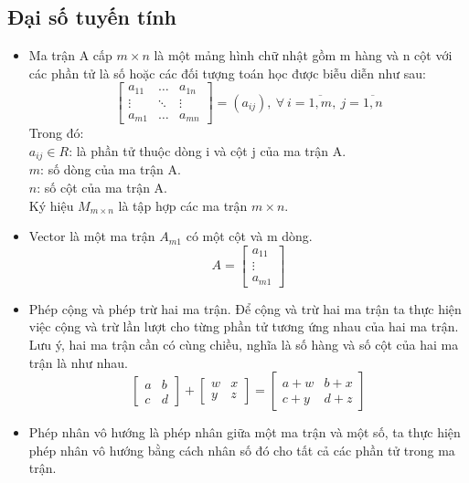 \subsection{Đại số tuyến tính}
\begin{itemize}
\item Ma trận A cấp $m \times n$ là một mảng hình chữ nhật gồm m hàng và n cột
với các phần tử là số hoặc các đối tượng toán học được biễu diễn như sau:\\
\[
\begin{bmatrix}
    a_{11} & \dots  & a_{1n} \\
    \vdots & \ddots & \vdots \\
    a_{m1} & \dots  & a_{mn}
\end{bmatrix}
= (a_{ij}),\: \forall\: i = \overline{1,m},\: j = \overline{1,n}
\]
Trong đó:\\
\tab $a_{ij} \in R$: là phần tử thuộc dòng i và cột j của ma trận A.\\
\tab $m$: số dòng của ma trận A. \\
\tab $n$: số cột của ma trận A.\\ 
Ký hiệu $M_{m \times n}$ là tập hợp các ma trận $m \times n$.\\ 
\item Vector là một ma trận $A_{m1}$ có một cột và m dòng.
\[
A = 
\begin{bmatrix}
a_{11}\\
\vdots\\
a_{m1}
\end{bmatrix}
\]
\item Phép cộng và phép trừ hai ma trận. Để cộng và trừ hai ma trận ta thực hiện
việc cộng và trừ lần lượt cho từng phần tử tương ứng nhau của hai ma trận. Lưu ý, hai
ma trận cần có cùng chiều, nghĩa là số hàng và số cột của hai ma trận là như
nhau.\\
\[
\begin{bmatrix}
a & b\\
c & d
\end{bmatrix}
+
\begin{bmatrix}
w & x\\
y & z
\end{bmatrix}
=
\begin{bmatrix}
a+w & b+x\\
c+y & d+z
\end{bmatrix}
\]
\item Phép nhân vô hướng là phép nhân giữa một ma trận và một số, ta thực hiện
phép nhân vô hướng bằng cách nhân số đó cho tất cả các phần tử trong ma trận.\\

\end{itemize}
